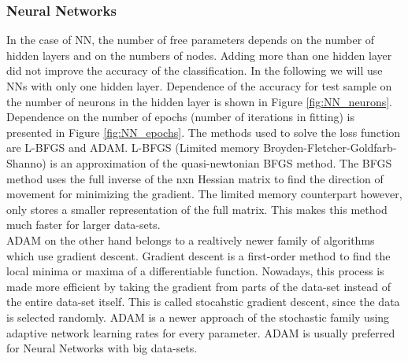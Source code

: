 \subsubsection{Neural Networks}

In the case of NN, the number of free parameters depends on the number of hidden layers and on the numbers of nodes.
Adding more than one hidden layer did not improve the accuracy of the classification.
In the following we will use NNs with only one hidden layer.
Dependence of the accuracy for test sample on the number of neurons in the hidden layer is shown in Figure \ref{fig:NN_neurons}.
Dependence on the number of epochs (number of iterations in fitting) is presented in Figure \ref{fig:NN_epochs}. 
The methods used to solve the loss function are L-BFGS and ADAM. L-BFGS (Limited memory Broyden-Fletcher-Goldfarb-Shanno) is an approximation of the quasi-newtonian BFGS method. The BFGS method uses the full inverse of the nxn Hessian matrix to find the direction of movement for minimizing the gradient. The limited memory counterpart however, only stores a smaller representation of the full matrix. This makes this method much faster for larger data-sets.\\
ADAM on the other hand belongs to a realtively newer family of algorithms which use gradient descent. Gradient descent is a first-order method to find the local minima or maxima of a differentiable function. Nowadays, this process is made more efficient by taking the gradient from parts of the data-set instead of the entire data-set itself. This is called stocahstic gradient descent, since the data is selected randomly. ADAM is a newer approach of the stochastic family using adaptive network learning rates for every parameter. ADAM is usually preferred for Neural Networks with big data-sets.\\ 

